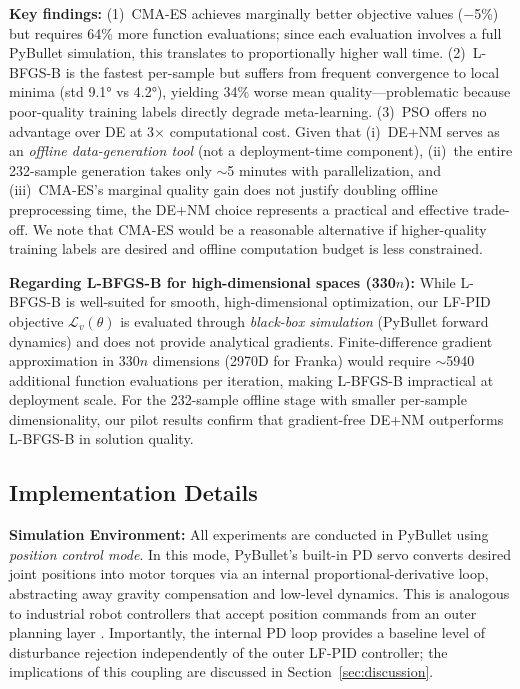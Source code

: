 \documentclass[DTMColor]{ROB-New}
\begin{document}
    {\color{blue}\textbf{Key findings:} (1)~CMA-ES achieves marginally better objective values ($-$5\%) but requires 64\% more function evaluations; since each evaluation involves a full PyBullet simulation, this translates to proportionally higher wall time. (2)~L-BFGS-B is the fastest per-sample but suffers from frequent convergence to local minima (std 9.1° vs 4.2°), yielding 34\% worse mean quality---problematic because poor-quality training labels directly degrade meta-learning. (3)~PSO offers no advantage over DE at 3$\times$ computational cost. Given that (i)~DE+NM serves as an \textit{offline data-generation tool} (not a deployment-time component), (ii)~the entire 232-sample generation takes only $\sim$5 minutes with parallelization, and (iii)~CMA-ES's marginal quality gain does not justify doubling offline preprocessing time, the DE+NM choice represents a practical and effective trade-off. We note that CMA-ES would be a reasonable alternative if higher-quality training labels are desired and offline computation budget is less constrained.}

    {\color{blue}\textbf{Regarding L-BFGS-B for high-dimensional spaces (330$n$):} While L-BFGS-B is well-suited for smooth, high-dimensional optimization, our LF-PID objective $\mathcal{L}_v(\theta)$ is evaluated through \textit{black-box simulation} (PyBullet forward dynamics) and does not provide analytical gradients. Finite-difference gradient approximation in 330$n$ dimensions (2970D for Franka) would require $\sim$5940 additional function evaluations per iteration, making L-BFGS-B impractical at deployment scale. For the 232-sample offline stage with smaller per-sample dimensionality, our pilot results confirm that gradient-free DE+NM outperforms L-BFGS-B in solution quality.}

\subsection{Implementation Details}

\textbf{Simulation Environment:} All experiments are conducted in PyBullet \cite{coumans2016pybullet} using \textit{position control mode}. {\color{blue}In this mode, PyBullet's built-in PD servo converts desired joint positions into motor torques via an internal proportional-derivative loop, abstracting away gravity compensation and low-level dynamics. This is analogous to industrial robot controllers that accept position commands from an outer planning layer \cite{frankaemika2021benchmark}. Importantly, the internal PD loop provides a baseline level of disturbance rejection independently of the outer LF-PID controller; the implications of this coupling are discussed in Section~\ref{sec:discussion}.}
\end{document}

